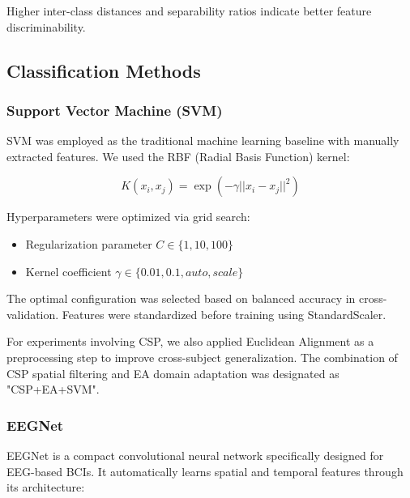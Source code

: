 \documentclass[conference]{IEEEtran}
\begin{document}
Higher inter-class distances and separability ratios indicate better feature discriminability.

\subsection{Classification Methods}

\subsubsection{Support Vector Machine (SVM)}
SVM was employed as the traditional machine learning baseline with manually extracted features. We used the RBF (Radial Basis Function) kernel:

\begin{equation}
K(x_i, x_j) = \exp\left(-\gamma ||x_i - x_j||^2\right)
\end{equation}

Hyperparameters were optimized via grid search:
\begin{itemize}
    \item Regularization parameter $C \in \{1, 10, 100\}$
    \item Kernel coefficient $\gamma \in \{0.01, 0.1, auto, scale\}$
\end{itemize}

The optimal configuration was selected based on balanced accuracy in cross-validation. Features were standardized before training using StandardScaler.

For experiments involving CSP, we also applied Euclidean Alignment as a preprocessing step to improve cross-subject generalization. The combination of CSP spatial filtering and EA domain adaptation was designated as "CSP+EA+SVM".

\subsubsection{EEGNet}
EEGNet is a compact convolutional neural network specifically designed for EEG-based BCIs. It automatically learns spatial and temporal features through its architecture:
\end{document}
